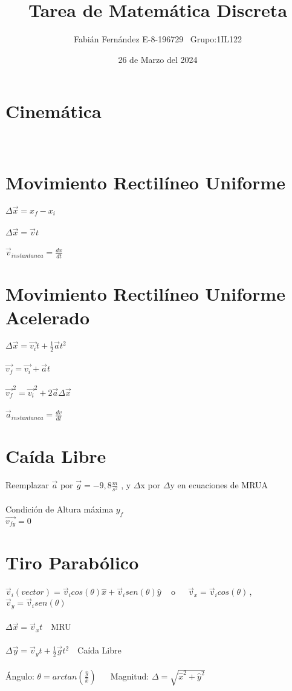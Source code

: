 \documentclass[14pt]{extarticle}
\title{Tarea de Matemática Discreta}
\author{Fabián Fernández E-8-196729   \,\,\,Grupo:1IL122}
\date{26 de Marzo del 2024}
\begin{document}
    \section*{}

	\section*{\centering Cinemática}

	\section*{\\ \normalsize Movimiento Rectilíneo Uniforme}
	$\Delta \vec{x} = x_f - x_i$ \\\\
	$\Delta \vec{x} = \vec{v} t$ \\\\
 $\vec{v}_{instantanea} = \frac{dx}{dt}$
	\section*{\normalsize Movimiento Rectilíneo Uniforme Acelerado}
	$\Delta \vec{x} = \vec{v_i}t + \frac{1}{2} \vec{a}t^2$ \\\\
	$\vec{v_f} = \vec{v_i} + \vec{a}t$ \\\\
	$\vec{v_f}^2 = \vec{v_i}^2 + 2\vec{a}\Delta \vec{x}$\\\\
    $\vec{a}_{instantanea} =  \frac{dv}{dt}$
	\section*{\normalsize Caída Libre}
	Reemplazar $\vec{a}$ por $\vec{g} = -9,8 \frac{m}{s^2}$ , y $\Delta$x por $\Delta$y  en ecuaciones de MRUA \\\\
	Condición de Altura máxima $y_f$\\
	$\vec{v_{fy}} = 0$
	\section*{\normalsize Tiro Parabólico}
	$\vec{v}_{i} (vector) = \vec{v}_i cos(\theta) \hat{x} + \vec{v}_i sen(\theta) \hat{y} $  \,\,\,\,\,o  \,\,\,\,\, $\vec{v}_x = \vec{v}_icos(\theta)$\,,\,$\vec{v}_y = \vec{v}_isen(\theta)$ \\\\
	$\Delta \vec{x} = \vec{v}_x t$ \,\,\,\,MRU \\\\
	$\Delta \vec{y} = \vec{v}_yt + \frac{1}{2}\vec{g}t^2$ \,\,\,\,Caída Libre \\\\
	Ángulo: $\theta = arctan(\frac{\hat{y}}{\hat{x}})$ \,\,\,\,\,\,
	Magnitud: $\Delta = \sqrt{\hat{x}^2 + \hat{y}^2}$
	
	
	

	
\end{document}
